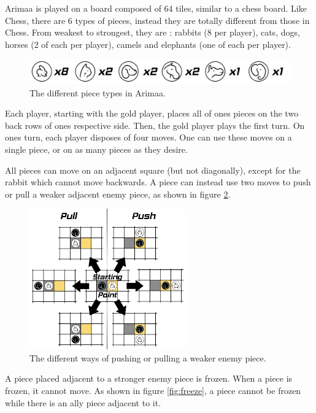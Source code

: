 \label{first part}
Arimaa is played on a board composed of 64 tiles, similar to a chess board. Like Chess, there are 6 types of pieces, instead they are totally different from those in Chess. From weakest to strongest, they are : rabbits (8 per player), cats, dogs, horses (2 of each per player), camels and elephants (one of each per player).%

\begin{figure}[!h]
\centering
\includegraphics[width=\textwidth]{1_Presentation/1.1_Arimaa_rules_Gabriel/Pictures/Pieces.png}
\caption{The different piece types in Arimaa.}
\label{fig:pieces}
\end{figure}

Each player, starting with the gold player, places all of ones pieces on the two back rows of ones respective side. Then, the gold player plays the first turn.
On ones turn, each player disposes of four moves. One can use these moves on a single piece, or on as many pieces as they desire.

All pieces can move on an adjacent square (but not diagonally), except for the rabbit which cannot move backwards.
A piece can instead use two moves to push or pull a weaker adjacent enemy piece, as shown in figure \ref{fig:displace}.

\begin{figure}[!h]
\centering
\includegraphics[width=0.6\textwidth]{1_Presentation/1.1_Arimaa_rules_Gabriel/Pictures/Displace.png}
\caption{The different ways of pushing or pulling a weaker enemy piece.}
\label{fig:displace}
\end{figure}

A piece placed adjacent to a stronger enemy piece is frozen. When a piece is frozen, it cannot move. As shown in figure \ref{fig:freeze}, a piece cannot be frozen while there is an ally piece adjacent to it.

